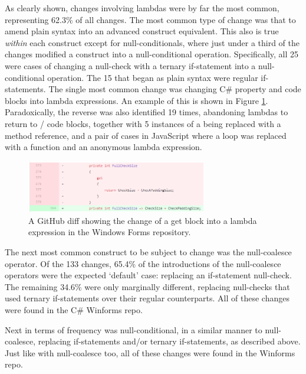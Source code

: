 \documentclass{article}
\begin{document}
        As clearly shown, changes involving lambdas were by far the most common, representing 62.3\% of all changes. The most common type of change was that to amend plain syntax into an advanced construct equivalent. This also is true \emph{within} each construct except for null-conditionals, where just under a third of the changes modified a construct into a null-conditional operation. Specifically, all 25 were cases of changing a null-check with a ternary if-statement into a null-conditional operation. The 15 that began as plain syntax were regular if-statements. The single most common change was changing C\# property  and  code blocks into lambda expressions. An example of this is shown in Figure \ref{fig:getSetEx}. Paradoxically, the reverse was also identified 19 times, abandoning lambdas to return to / code blocks, together with 5 instances of a being replaced with a method reference, and a pair of cases in JavaScript where a  loop was replaced with a  function and an anonymous lambda expression.
        \\

        \begin{figure}[htbp]
            \centering
            \includegraphics[width=0.7\textwidth]{getSetEx}
            \caption{A GitHub diff showing the change of a get block into a lambda expression in the Windows Forms repository.}
            \label{fig:getSetEx}
        \end{figure}

        The  next most common construct to be subject to change was the null-coalesce operator. Of the 133 changes, 65.4\% of the introductions of the null-coalesce operators were the expected `default' case: replacing an if-statement null-check. The remaining 34.6\% were only marginally different, replacing null-checks that used ternary if-statements over their regular counterparts. All of these changes were found in the C\# Winforms repo.

        Next in terms of frequency was null-conditional, in a similar manner to null-coalesce, replacing if-statements and/or ternary if-statements, as described above. Just like with null-coalesce too, all of these changes were found in the Winforms repo.
\end{document}
